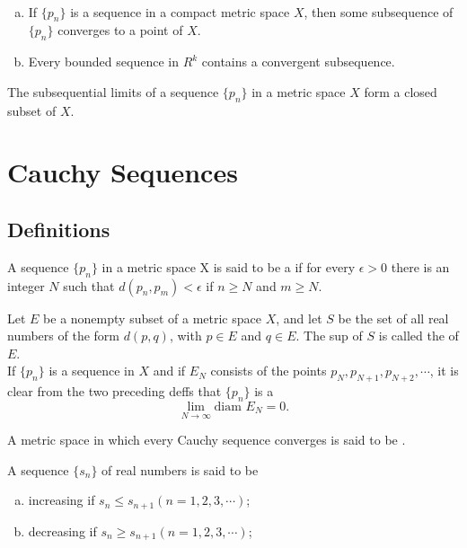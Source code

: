 \begin{thm}
	~
	\begin{enumerate}[(a)]
		\item If $\{p_n\}$ is a sequence in a compact metric space $X$, then some subsequence of $\{p_n\}$ converges to a point of $X$.
		\item Every bounded sequence in $R^k$ contains a convergent subsequence.
	\end{enumerate}
\end{thm}

\begin{thm}
	The subsequential limits of a sequence $\{p_n\}$ in a metric space $X$ form a closed subset of $X$.
\end{thm}

\section{Cauchy Sequences}
\subsection{Definitions}
\begin{deff}
	A sequence $\{p_n\}$ in a metric space X is said to be a {} if for every $\epsilon>0$ there is an integer $N$ such that $d(p_n,p_m)<\epsilon$ if $n\geq N$ and $m\geq N$.
\end{deff}

\begin{deff}
	Let $E$ be a nonempty subset of a metric space $X$, and let $S$ be the set of all real numbers of the form $d(p,q)$, with $p\in E$ and $q\in E$. The sup of $S$ is called the {} of $E$.\\
	If $\{p_n\}$ is a sequence in $X$ and if $E_N$ consists of the points $p_N, p_{N+1}, p_{N+2}, \cdots$, it is clear from the two preceding deffs that $\{p_n\}$ is a {} $$\lim_{N \to \infty} \text{diam }E_N =0.$$
\end{deff}

\begin{deff}
	A metric space in which every Cauchy sequence converges is said to be {}. 
\end{deff}

\begin{deff}
	A sequence $\{s_n\}$ of real numbers is said to be
	\begin{enumerate}[(a)]
		\item {} increasing if $s_n \leq s_{n+1} (n=1,2,3,\cdots)$;
		\item {} decreasing if $s_n \geq s_{n+1} (n=1,2,3,\cdots)$;
	\end{enumerate}
\end{deff}

